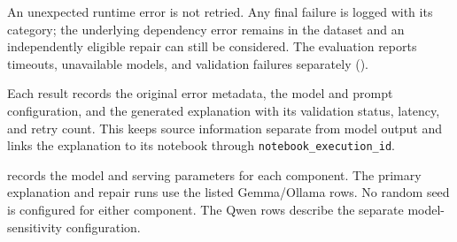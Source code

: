An unexpected runtime error is not retried. Any final failure is logged with
its category; the underlying dependency error remains in the dataset and an
independently eligible repair can still be considered. The evaluation reports
timeouts, unavailable models, and validation failures separately
().

Each result records the original error metadata, the model and prompt
configuration, and the generated explanation with its validation status,
latency, and retry count. This keeps source information separate from model
output and links the explanation to its notebook through
\texttt{notebook\_execution\_id}.

 records the model and serving parameters for
each component. The primary explanation and repair runs use the listed
Gemma/Ollama rows. No random seed is configured for either component. The
Qwen rows describe the separate model-sensitivity configuration.

